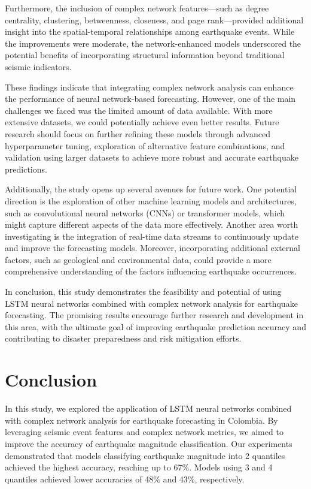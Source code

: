 \documentclass[sn-mathphys-num]{sn-jnl}
\begin{document}
Furthermore, the inclusion of complex network features—such as degree centrality, clustering, betweenness, closeness, and page rank—provided additional insight into the spatial-temporal relationships among earthquake events. While the improvements were moderate, the network-enhanced models underscored the potential benefits of incorporating structural information beyond traditional seismic indicators.

These findings indicate that integrating complex network analysis can enhance the performance of neural network-based forecasting. However, one of the main challenges we faced was the limited amount of data available. With more extensive datasets, we could potentially achieve even better results. Future research should focus on further refining these models through advanced hyperparameter tuning, exploration of alternative feature combinations, and validation using larger datasets to achieve more robust and accurate earthquake predictions.

Additionally, the study opens up several avenues for future work. One potential direction is the exploration of other machine learning models and architectures, such as convolutional neural networks (CNNs) or transformer models, which might capture different aspects of the data more effectively. Another area worth investigating is the integration of real-time data streams to continuously update and improve the forecasting models. Moreover, incorporating additional external factors, such as geological and environmental data, could provide a more comprehensive understanding of the factors influencing earthquake occurrences.

In conclusion, this study demonstrates the feasibility and potential of using LSTM neural networks combined with complex network analysis for earthquake forecasting. The promising results encourage further research and development in this area, with the ultimate goal of improving earthquake prediction accuracy and contributing to disaster preparedness and risk mitigation efforts.

\section{Conclusion}\label{conclusion}

In this study, we explored the application of LSTM neural networks combined with complex network analysis for earthquake forecasting in Colombia. By leveraging seismic event features and complex network metrics, we aimed to improve the accuracy of earthquake magnitude classification. Our experiments demonstrated that models classifying earthquake magnitude into 2 quantiles achieved the highest accuracy, reaching up to 67\%. Models using 3 and 4 quantiles achieved lower accuracies of 48\% and 43\%, respectively.
\end{document}
